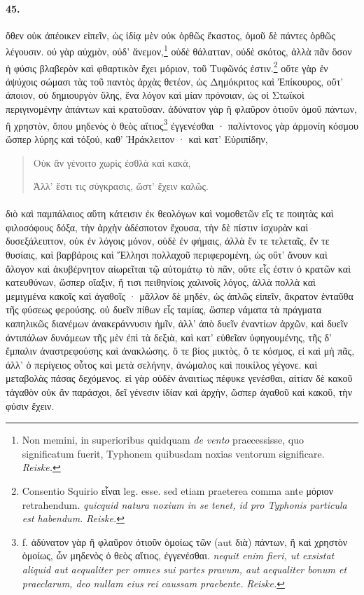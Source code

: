 \documentclass[a4paper, 11pt, oneside, polutonikogreek, german]{article}
\begin{document}
\paragraph{45.}
ὅθεν οὐκ ἀπέοικεν εἰπεῖν, ὡς ἰδίᾳ μὲν οὐκ ὀρθῶς ἕκαστος, ὁμοῦ δὲ πάντες ὀρθῶς λέγουσιν. οὐ γὰρ αὐχμὸν, οὐδ' ἄνεμον,\footnote{Non memini, in superioribus quidquam \emph{de vento} praecessisse, quo significatum fuerit, Typhonem quibusdam noxias ventorum significare. \emph{Reiske.}} οὐδὲ θάλατταν, οὐδὲ σκότος, ἀλλὰ πᾶν ὅσον ἡ φύσις βλαβερὸν καὶ φθαρτικὸν ἔχει μόριον, τοῦ Τυφῶνός ἐστιν.\footnote{Consentio Squirio εἶναι leg. esse. sed etiam praeterea comma ante μόριον retrahendum. \emph{quicquid natura noxium in se tenet, id pro Typhonis particula est habendum.} \emph{Reiske.}} οὔτε γὰρ ἐν ἀψύχοις σώμασι τὰς τοῦ παντὸς ἀρχὰς θετέον, ὡς Δημόκριτος καὶ Ἐπίκουρος, οὔτ' ἀποιον, οὐ δημιουργὸν ὕλης, ἕνα λόγον καὶ μίαν πρόνοιαν, ὡς οἱ Στωϊκοὶ περιγινομένην ἁπάντων καὶ κρατοῦσαν. ἀδύνατον γὰρ ἢ φλαῦρον ὁτιοῦν ὁμοῦ πάντων, ἢ χρηστὸν, ὅπου μηδενὸς ὁ θεὸς αἴτιος\footnote{f. ἀδύνατον γὰρ ἢ φλαῦρον ὁτιοῦν ὁμοίως τῶν (aut διὰ) πάντων, ἢ καὶ χρηστὸν ὁμοίως, ὧν μηδενὸς ὁ θεὸς αἴτιος, ἐγγενέσθαι. \emph{nequit enim fieri, ut exsistat aliquid aut aequaliter per omnes sui partes pravum, aut aequaliter bonum et praeclarum, deo nullam eius rei caussam praebente.} \emph{Reiske.}} ἐγγενέσθαι · παλίντονος γὰρ ἁρμονίη κόσμου ὥσπερ λύρης καὶ τόξού, καθ' Ἡράκλειτον · καὶ κατ' Εὐριπίδην,
\begin{quotation}\tiny
Οὐκ ἂν γένοιτο χωρὶς ἐσθλὰ καὶ κακὰ,

Ἀλλ' ἔστι τις σύγκρασις, ὥστ' ἔχειν καλῶς.
\end{quotation}
\paragraph{}
διὸ καὶ παμπάλαιος αὕτη κάτεισιν ἐκ θεολόγων καὶ νομοθετῶν εἴς τε ποιητὰς καὶ φιλοσόφους δόξα, τὴν ἀρχὴν ἀδέσποτον ἔχουσα, τὴν δὲ πίστιν ἰσχυρὰν καὶ δυσεξάλειπτον, οὐκ ἐν λόγοις μόνον, οὐδὲ ἐν φήμαις, ἀλλὰ ἔν τε τελεταῖς, ἔν τε θυσίαις, καὶ βαρβάροις καὶ Ἕλλησι πολλαχοῦ περιφερομένη, ὡς οὔτ' ἄνουν καὶ ἄλογον καὶ ἀκυβέρνητον αἰωρεῖται τῷ αὐτομάτῳ τὸ πᾶν, οὔτε εἷς ἐστιν ὁ κρατῶν καὶ κατευθύνων, ὥσπερ οἴαξιν, ἤ τισι πειθηνίοις χαλινοῖς λόγος, ἀλλὰ πολλὰ καὶ μεμιγμένα κακοῖς καὶ ἀγαθοῖς · μᾶλλον δὲ μηδὲν, ὡς ἁπλῶς εἰπεῖν, ἄκρατον ἐνταῦθα τῆς φύσεως φερούσης. οὐ δυεῖν πίθων εἷς ταμίας, ὥσπερ νάματα τὰ πράγματα καπηλικῶς διανέμων ἀνακεράννυσιν ἡμῖν, ἀλλ' ἀπὸ δυεῖν ἐναντίων ἀρχῶν, καὶ δυεῖν ἀντιπάλων δυνάμεων τῆς μὲν ἐπὶ τὰ δεξιὰ, καὶ κατ' εὐθεῖαν ὑφηγουμένης, τῆς δ' ἔμπαλιν ἀναστρεφούσης καὶ ἀνακλώσης. ὅ τε βίος μικτὸς, ὅ τε κόσμος, εἰ καὶ μὴ πᾶς, ἀλλ' ὁ περίγειος οὗτος καὶ μετὰ σελήνην, ἀνώμαλος καὶ ποικίλος γέγονε. καὶ μεταβολὰς πάσας δεχόμενος. εἰ γὰρ οὐδὲν ἀναιτίως πέφυκε γενέσθαι, αἰτίαν δὲ κακοῦ τἀγαθὸν οὐκ ἂν παράσχοι, δεῖ γένεσιν ἰδίαν καὶ ἀρχὴν, ὥσπερ ἀγαθοῦ καὶ κακοῦ, τὴν φύσιν ἔχειν.
\end{document}
